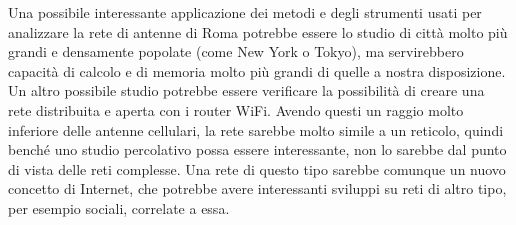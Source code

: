 Una possibile interessante applicazione dei metodi e degli strumenti usati per analizzare la rete di antenne di Roma potrebbe essere lo studio di città molto più grandi e densamente popolate (come New York o Tokyo), ma servirebbero capacità di calcolo e di memoria molto più grandi di quelle a nostra disposizione. Un altro possibile studio potrebbe essere verificare la possibilità di creare una rete distribuita e aperta con i router WiFi. Avendo questi un raggio molto inferiore delle antenne cellulari, la rete sarebbe molto simile a un reticolo, quindi benché uno studio percolativo possa essere interessante, non lo sarebbe dal punto di vista delle reti complesse. 
Una rete di questo tipo sarebbe comunque un nuovo concetto di Internet, che potrebbe avere interessanti sviluppi su reti di altro tipo, per esempio sociali, correlate a essa.